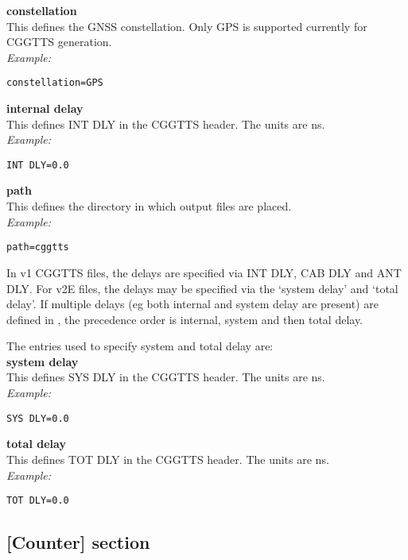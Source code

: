 {\bfseries constellation}\\
This defines the GNSS constellation. Only GPS is supported currently for CGGTTS generation.\\
\textit{Example:}
\begin{lstlisting}
constellation=GPS
\end{lstlisting}

{\bfseries internal delay}\\
This defines INT DLY in the CGGTTS header. The units are ns.\\
\textit{Example:}
\begin{lstlisting}
INT DLY=0.0
\end{lstlisting}

{\bfseries path}\\
This defines the directory in which output files are placed.\\
\textit{Example:}
\begin{lstlisting}
path=cggtts
\end{lstlisting}

In v1 CGGTTS files, the delays are specified via INT DLY, CAB DLY and ANT DLY.  
For v2E files, the delays may be specified via the `system delay' and `total delay'.
If multiple delays (eg both internal and system delay are present) are defined in
, the precedence order is internal, system and then total delay.

The entries used to specify system and total delay are:\\

{\bfseries system delay}\\
This defines SYS DLY in the CGGTTS header. The units are ns.\\
\textit{Example:}
\begin{lstlisting}
SYS DLY=0.0
\end{lstlisting}

{\bfseries total delay}\\
This defines TOT DLY in the CGGTTS header. The units are ns.\\
\textit{Example:}
\begin{lstlisting}
TOT DLY=0.0
\end{lstlisting}

\subsection{[Counter] section}

\hypertarget{h:counter}{}

